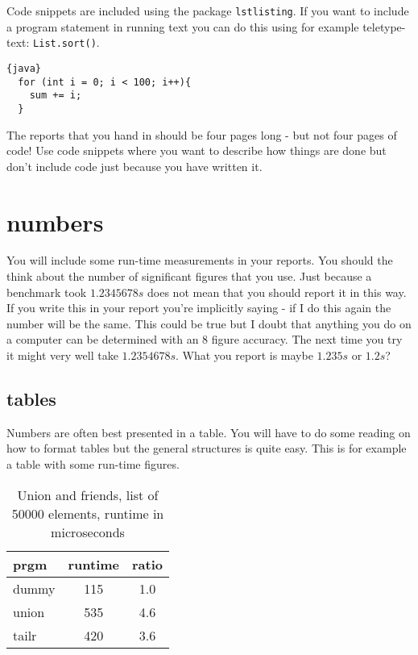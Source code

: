 \documentclass[a4paper,11pt]{article}
\begin{document}
Code snippets are included using the package {\tt lstlisting}. If you
want to include a program statement in running text you can do this
using for example teletype-text: {\tt List.sort()}.

\begin{lstlisting}{java}
  for (int i = 0; i < 100; i++){
    sum += i;
  }
\end{lstlisting}

The reports that you hand in should be four pages long - but not four
pages of code! Use code snippets where you want to describe how things
are done but don't include code just because you have written it. 

\section*{numbers}

You will include some run-time measurements in your reports. You
should the think about the number of significant figures that you
use. Just because a benchmark took $1.2345678 s$ does not mean that
you should report it in this way. If you write this in your report
you're implicitly saying - if I do this again the number will be the
same. This could be true but I doubt that anything you do on a
computer can be determined with an 8 figure accuracy. The next time
you try it might very well take $1.2354678 s$. What you report is
maybe $1.235 s$ or $1.2 s$?

\subsection*{tables}

Numbers are often best presented in a table. You will have to do some
reading on how to format tables but the general structures is quite
easy. This is for example a table with some run-time figures.

\begin{table}[h]
\begin{center}
\begin{tabular}{l|c|c}
\textbf{prgm} & \textbf{runtime} & \textbf{ratio}\\
\hline
  dummy      &  115 &     1.0\\
  union      &  535 &     4.6\\
  tailr      &  420 &     3.6\\
\end{tabular}
\caption{Union and friends, list of 50000 elements, runtime in microseconds}
\label{tab:table1}
\end{center}
\end{table}
\end{document}
